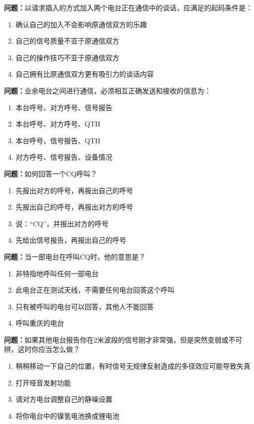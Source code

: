 \documentclass[UTF8]{ctexbook}
\begin{document}
\textbf{问题：}以请求插入的方式加入两个电台正在通信中的谈话，应满足的起码条件是：
\begin{enumerate}[label=\Alph*), leftmargin=3em]
  \item 确认自己的加入不会影响原通信双方的乐趣
  \item 自己的信号质量不亚于原通信双方
  \item 自己的操作技巧不亚于原通信双方
  \item 自己拥有比原通信双方更有吸引力的谈话内容
\end{enumerate}

\textbf{问题：}业余电台之间进行通信，必须相互正确发送和接收的信息为：
\begin{enumerate}[label=\Alph*), leftmargin=3em]
  \item 本台呼号、对方呼号、信号报告
  \item 本台呼号、对方呼号、QTH
  \item 本台呼号、信号报告、QTH
  \item 对方呼号、信号报告、设备情况
\end{enumerate}

\textbf{问题：}如何回答一个CQ呼叫？
\begin{enumerate}[label=\Alph*), leftmargin=3em]
  \item 先报出对方的呼号，再报出自己的呼号
  \item 先报出自己的呼号，再报出对方的呼号
  \item 说：“CQ”，并报出对方的呼号
  \item 先给出信号报告，再报出自己的呼号
\end{enumerate}

\textbf{问题：}当一部电台在呼叫CQ时，他的意思是？
\begin{enumerate}[label=\Alph*), leftmargin=3em]
  \item 非特指地呼叫任何一部电台
  \item 此电台正在测试天线，不需要任何电台回答这个呼叫
  \item 只有被呼叫的电台可以回答，其他人不能回答
  \item 呼叫重庆的电台
\end{enumerate}

\textbf{问题：}如果其他电台报告你在2米波段的信号刚才非常强，但是突然变弱或不可辨，这时你应当怎么做？
\begin{enumerate}[label=\Alph*), leftmargin=3em]
  \item 稍稍移动一下自己的位置，有时信号无规律反射造成的多径效应可能导致失真
  \item 打开哑音发射功能
  \item 请对方电台调整自己的静噪设置
  \item 将你电台中的镍氢电池换成锂电池
\end{enumerate}
\end{document}
